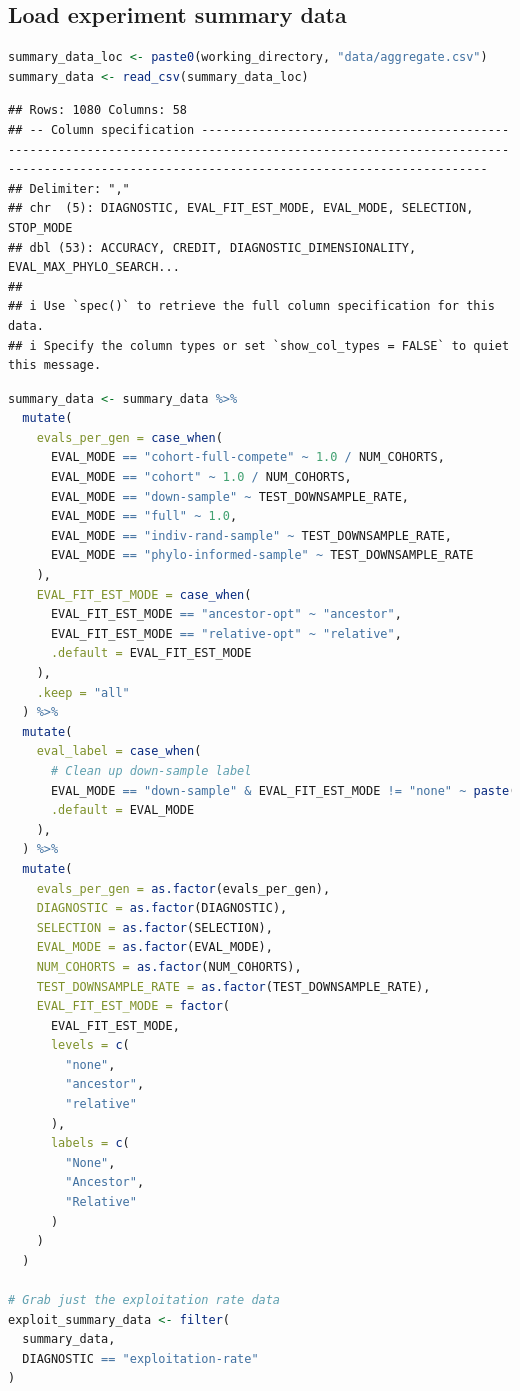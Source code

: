 \documentclass[
]{book}
\begin{document}
\hypertarget{load-experiment-summary-data}{%
\subsection{Load experiment summary data}\label{load-experiment-summary-data}}

\begin{lstlisting}[language=R]
summary_data_loc <- paste0(working_directory, "data/aggregate.csv")
summary_data <- read_csv(summary_data_loc)
\end{lstlisting}

\begin{lstlisting}
## Rows: 1080 Columns: 58
## -- Column specification ------------------------------------------------------------------------------------------------------------------------------------------------------------------------------------
## Delimiter: ","
## chr  (5): DIAGNOSTIC, EVAL_FIT_EST_MODE, EVAL_MODE, SELECTION, STOP_MODE
## dbl (53): ACCURACY, CREDIT, DIAGNOSTIC_DIMENSIONALITY, EVAL_MAX_PHYLO_SEARCH...
## 
## i Use `spec()` to retrieve the full column specification for this data.
## i Specify the column types or set `show_col_types = FALSE` to quiet this message.
\end{lstlisting}

\begin{lstlisting}[language=R]
summary_data <- summary_data %>%
  mutate(
    evals_per_gen = case_when(
      EVAL_MODE == "cohort-full-compete" ~ 1.0 / NUM_COHORTS,
      EVAL_MODE == "cohort" ~ 1.0 / NUM_COHORTS,
      EVAL_MODE == "down-sample" ~ TEST_DOWNSAMPLE_RATE,
      EVAL_MODE == "full" ~ 1.0,
      EVAL_MODE == "indiv-rand-sample" ~ TEST_DOWNSAMPLE_RATE,
      EVAL_MODE == "phylo-informed-sample" ~ TEST_DOWNSAMPLE_RATE
    ),
    EVAL_FIT_EST_MODE = case_when(
      EVAL_FIT_EST_MODE == "ancestor-opt" ~ "ancestor",
      EVAL_FIT_EST_MODE == "relative-opt" ~ "relative",
      .default = EVAL_FIT_EST_MODE
    ),
    .keep = "all"
  ) %>%
  mutate(
    eval_label = case_when(
      # Clean up down-sample label
      EVAL_MODE == "down-sample" & EVAL_FIT_EST_MODE != "none" ~ paste("down-sample", EVAL_FIT_EST_MODE, sep="-"),
      .default = EVAL_MODE
    ),
  ) %>%
  mutate(
    evals_per_gen = as.factor(evals_per_gen),
    DIAGNOSTIC = as.factor(DIAGNOSTIC),
    SELECTION = as.factor(SELECTION),
    EVAL_MODE = as.factor(EVAL_MODE),
    NUM_COHORTS = as.factor(NUM_COHORTS),
    TEST_DOWNSAMPLE_RATE = as.factor(TEST_DOWNSAMPLE_RATE),
    EVAL_FIT_EST_MODE = factor(
      EVAL_FIT_EST_MODE,
      levels = c(
        "none",
        "ancestor",
        "relative"
      ),
      labels = c(
        "None",
        "Ancestor",
        "Relative"
      )
    )
  )

# Grab just the exploitation rate data
exploit_summary_data <- filter(
  summary_data,
  DIAGNOSTIC == "exploitation-rate"
)
\end{lstlisting}
\end{document}
